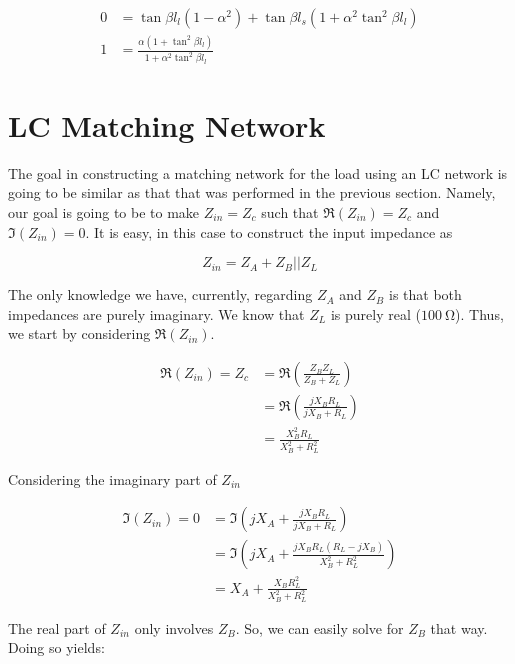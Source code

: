 \begin{align*}
    0 &= \tan \beta l_l \left( 1-\alpha^2 \right) + \tan \beta l_s \left( 1 +
\alpha^2 \tan^2\beta l_l \right) \\
1&= \frac{\alpha \left( 1+\tan^2\beta l_l \right)}{1+\alpha^2 \tan^2\beta l_l}
\end{align*}


\section*{LC Matching Network}

The goal in constructing a matching network for the load using an LC network is
going to be similar as that that was performed in the previous section. Namely,
our goal is going to be to make $Z_{in} = Z_c$ such that $\Re \left( Z_{in}
\right) = Z_c$ and $\Im \left( Z_{in} \right) = 0$. It is easy, in this case to
construct the input impedance as 

\[ 
        Z_{in} = Z_A + Z_B || Z_L 
\]

The only knowledge we have, currently, regarding $Z_A$ and $Z_B$ is that both
impedances are purely imaginary. We know that $Z_L$ is purely real ($
\SI{100}{\ohm}$). Thus, we start by considering $\Re \left( Z_{in} \right)$.

\begin{align*}
    \Re(Z_{in}) = Z_c &= \Re ( \frac{Z_B Z_L}{Z_B + Z_L} )\\
                      &= \Re ( \frac{j X_B R_L}{j X_B + R_L} ) \\
                      &= \frac{ X_B^2 R_L}{X_B^2 + R_L^2}
\end{align*}

Considering the imaginary part of $Z_{in}$

\begin{align}
    \Im \left( Z_{in} \right) = 0 &= \Im \left( j X_A + \frac{j X_B
    R_L}{j X_B + R_L} \right)	 \\
    &= \Im \left( j X_A + \frac{j X_B R_L \left( R_L - j X_B \right)}{
    X_B^2 + R_L^2} \right) \\
    &= X_A + \frac{ X_B R_L^2}{ X_B^2 + R_L^2}
\end{align}

The real part of $Z_{in}$ only involves $Z_B$. So, we can easily solve for $Z_B$
that way. Doing so yields:

